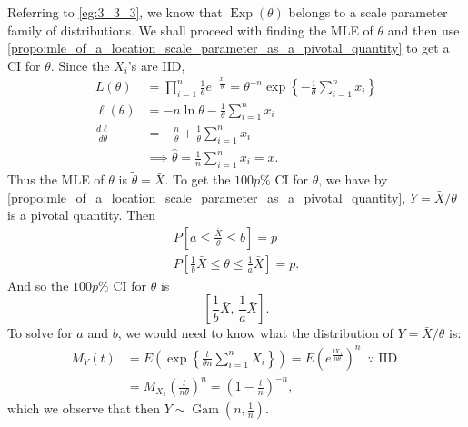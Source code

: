 \documentclass[notoc,notitlepage]{tufte-book}
\DeclareMathOperator{\Exp}{Exp }
\DeclareMathOperator{\Gam}{Gam }
\begin{document}
\begin{solution}
  Referring to \cref{eg:3_3_3}, we know that $\Exp(\theta)$ belongs to a scale parameter family of distributions. We shall proceed with finding the MLE of $\theta$ and then use \cref{propo:mle_of_a_location_scale_parameter_as_a_pivotal_quantity} to get a CI for $\theta$. Since the $X_i$'s are IID,
  \begin{align*}
    L(\theta) &= \prod_{i=1}^{n} \frac{1}{\theta} e^{- \frac{x_i}{\theta}} = \theta^{-n} \exp\left\{ - \frac{1}{\theta} \sum\limits_{i=1}^{n} x_i \right\} \\
    \ell(\theta) &= - n \ln \theta - \frac{1}{\theta} \sum_{i=1}^{n} x_i \\
    \frac{d \ell}{d \theta} &= - \frac{n}{\theta} + \frac{1}{\theta} \sum_{i=1}^{n} x_i \\
                            &\implies \hat{\theta} = \frac{1}{n} \sum_{i=1}^{n} x_i = \bar{x}.
  \end{align*}
  Thus the MLE of $\theta$ is $\tilde{\theta} = \bar{X}$. To get the $100p\%$ CI for $\theta$, we have by \cref{propo:mle_of_a_location_scale_parameter_as_a_pivotal_quantity}, $Y = \bar{X}/\theta$ is a pivotal quantity. Then
  \begin{gather*}
    P\left[ a \leq \frac{\bar{X}}{\theta} \leq b \right] = p \\
    P\left[ \frac{1}{b} \bar{X} \leq \theta \leq \frac{1}{a} \bar{X} \right] = p.
  \end{gather*}
  And so the $100p\%$ CI for $\theta$ is
  \begin{equation*}
    \left[ \frac{1}{b} \bar{X}, \, \frac{1}{a} \bar{X} \right].
  \end{equation*}
  To solve for $a$ and $b$, we would need to know what the distribution of $Y = \bar{X} / \theta$ is:
  \begin{align*}
    M_Y(t) &= E\left( \exp\left\{ \frac{t}{\theta n} \sum_{i=1}^{n} X_i\right\} \right) = E\left(e^{\frac{tX_1}{n \theta}}\right)^n \enspace \because \text{ IID } \\
           &= M_{X_1}\left( \frac{t}{n \theta} \right)^n = \left(1 - \frac{t}{n}\right)^{-n},
  \end{align*}
  which we observe that then $Y \sim \Gam\left(n, \frac{1}{n}\right)$.


\end{solution}
\end{document}
